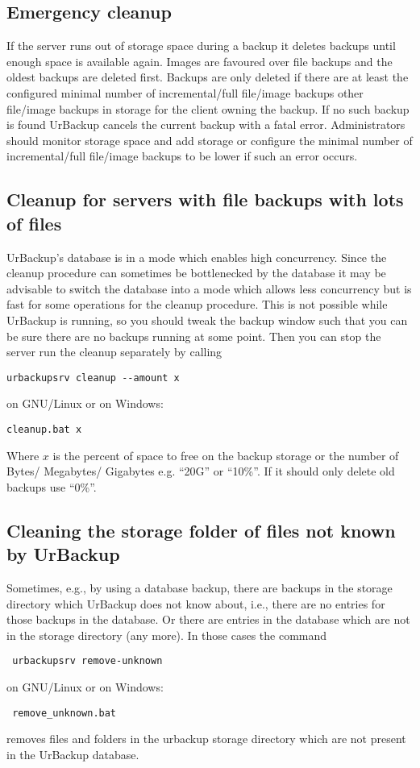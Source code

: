 \documentclass[a4paper,10pt]{article}
\begin{document}
\subsection{Emergency cleanup}

If the server runs out of storage space during a backup it deletes backups until enough space is available again. Images are favoured over file backups and the oldest backups are deleted first. Backups are only deleted if there are at least the configured minimal number of incremental/full file/image backups other file/image backups in storage for the client owning the backup. If no such backup is found UrBackup cancels the current backup with a fatal error. Administrators should monitor storage space and add storage or configure the minimal number of incremental/full file/image backups to be lower if such an error occurs.

\subsection{Cleanup for servers with file backups with lots of files}

UrBackup's database is in a mode which enables high concurrency. Since the cleanup procedure
can sometimes be bottlenecked by the database it may be advisable to switch the database into
a mode which allows less concurrency but is fast for some operations for the cleanup procedure. This is not possible while UrBackup is running, so you should tweak the backup window such that you can be sure there are no backups running at some point. Then you can stop the server run the cleanup separately by calling
\begin{verbatim}
urbackupsrv cleanup --amount x
\end{verbatim}
on GNU/Linux or on Windows:
\begin{verbatim}
cleanup.bat x
\end{verbatim}
Where $x$ is the percent of space to free on the backup storage or the number of Bytes/ Megabytes/ Gigabytes e.g. ``20G'' or ``10\%''. If it should only delete old backups
use ``0\%''.

\subsection{Cleaning the storage folder of files not known by UrBackup}
\label{subsec:remove_unknown}

Sometimes, e.g., by using a database backup, there are backups in the storage directory which UrBackup does not know about, i.e., there are no entries for those backups in the database. Or there are entries in the database which are not in the storage directory (any more).
In those cases the command
 \begin{verbatim}
 urbackupsrv remove-unknown
 \end{verbatim}
 on GNU/Linux or on Windows:
 \begin{verbatim}
 remove_unknown.bat
 \end{verbatim}
removes files and folders in the urbackup storage directory which are not present in the UrBackup database.\\
\end{document}
